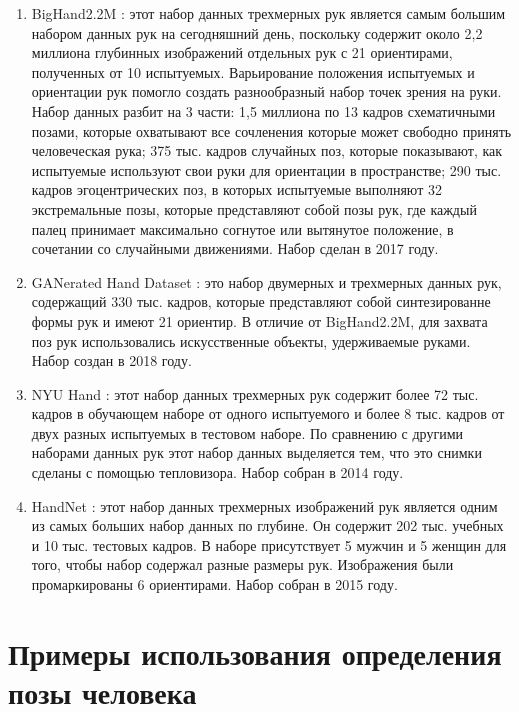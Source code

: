 \begin{enumerate}[label=\arabic*)]
	
	\item BigHand2.2M \cite{BigHand2.2M}: этот набор данных трехмерных рук является самым большим набором данных рук на сегодняшний день, поскольку содержит около 2,2 миллиона глубинных изображений отдельных рук с 21 ориентирами, полученных от 10 испытуемых.
	Варьирование положения испытуемых и ориентации рук помогло создать разнообразный набор точек зрения на руки.
	Набор данных разбит на 3 части: 1,5 миллиона по 13 кадров схематичными позами, которые охватывают все сочленения которые может свободно принять человеческая рука; 375 тыс. кадров случайных поз, которые показывают, как испытуемые используют свои руки для ориентации в пространстве; 290 тыс. кадров эгоцентрических поз, в которых испытуемые выполняют 32 экстремальные позы, которые представляют собой позы рук, где каждый палец принимает максимально согнутое или вытянутое положение, в сочетании со случайными движениями.
	Набор сделан в 2017 году.
	
	\item GANerated Hand Dataset \cite{GANeratedHands_CVPR2018}: это набор двумерных и трехмерных данных рук, содержащий 330 тыс. кадров, которые представляют собой синтезированне формы рук и имеют 21 ориентир.
	В отличие от BigHand2.2M, для захвата поз рук использовались искусственные объекты, удерживаемые руками.
	Набор создан в 2018 году. 
	
	\item NYU Hand \cite{tompson14tog}: этот набор данных трехмерных рук содержит более 72 тыс. кадров в обучающем наборе от одного испытуемого и более 8 тыс. кадров от двух разных испытуемых в тестовом наборе.
	По сравнению с другими наборами данных рук этот набор данных выделяется тем, что это снимки сделаны с помощью тепловизора. 
	Набор собран в 2014 году.
	
	\item HandNet \cite{WetzlerBMVC15}: этот набор данных трехмерных изображений рук является одним из самых больших набор данных по глубине.
	Он содержит 202 тыс. учебных и 10 тыс. тестовых кадров.
	В наборе присутствует 5 мужчин и 5 женщин для того, чтобы набор содержал разные размеры рук.
	Изображения были промаркированы 6 ориентирами.
	Набор собран в 2015 году.
	
	
\end{enumerate}

\section{Примеры использования определения позы человека}

